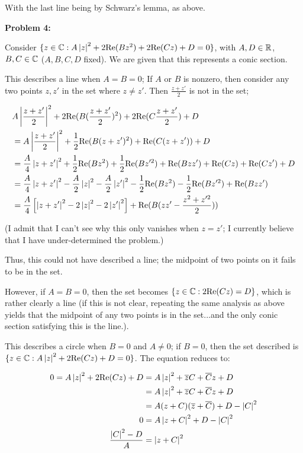 \documentclass[a4paper,12pt]{article}
\begin{document}
With the last line being by Schwarz's lemma, as above.

\shunt

{\bf Problem 4:}

Consider $\{z \in \mathbb{C}: A \left\lvert z \right\rvert^2 + 2\text{Re}(Bz^2) + 2\text{Re}(Cz) + D = 0\}$, with $A,D \in \mathbb{R}$, $B,C \in \mathbb{C}$ ($A,B,C,D$ fixed). We are given that this represents a conic section.

This describes a line when $A=B=0$; If $A$ or $B$ is nonzero, then consider any two points $z,z'$ in the set where $z \neq z'$. Then $\frac{z+z'}{2}$ is not in the set;

\begin{align*}
&A \left\lvert \frac{z+z'}{2} \right\rvert^2 + 2\text{Re}(B(\frac{z+z'}{2})^2) + 2\text{Re}(C\frac{z+z'}{2}) + D\\
&= A \left\lvert \frac{z+z'}{2} \right\rvert^2 + \frac{1}{2}\text{Re}(B(z+z')^2) + \text{Re}(C(z+z')) + D\\
&= \frac{A}{4} \left\lvert z+z' \right\rvert^2 + \frac{1}{2}\text{Re}(Bz^2)+ \frac{1}{2}\text{Re}(Bz'^2) + \text{Re}(Bzz') + \text{Re}(Cz) +\text{Re}(Cz')+ D\\
&= \frac{A}{4} \left\lvert z+z' \right\rvert^2 -\frac{A}{2}\left\lvert z \right\rvert^2 -\frac{A}{2}\left\lvert z' \right\rvert^2- \frac{1}{2}\text{Re}(Bz^2)- \frac{1}{2}\text{Re}(Bz'^2) + \text{Re}(Bzz')\\
&= \frac{A}{4} \left[\left\lvert z+z' \right\rvert^2 -2\left\lvert z \right\rvert^2 -2\left\lvert z' \right\rvert^2\right] + \text{Re}(B(zz'-\frac{z^2+z'^2}{2}))\\
\end{align*}

(I admit that I can't see why this only vanishes when $z=z'$; I currently believe that I have under-determined the problem.) %

Thus, this could not have described a line; the midpoint of two points on it fails to be in the set.

However, if $A=B=0$, then the set becomes $\{z \in \mathbb{C}: 2\text{Re}(Cz) = D\}$, which is rather clearly a line (if this is not clear, repeating the same analysis as above yields that the midpoint of any two points is in the set...and the only conic section satisfying this is the line.).

This describes a circle when $B=0$ and $A \neq 0$; if $B=0$, then the set described is $\{z \in \mathbb{C}: A\left\lvert z \right\rvert^2 + 2\text{Re}(Cz) + D = 0\}$. The equation reduces to:

\begin{align*}
0=A\left\lvert z \right\rvert^2 + 2\text{Re}(Cz) + D &= A\left\lvert z \right\rvert^2 + \overline{z}C + \overline{C}z + D\\
&= A\left\lvert z \right\rvert^2 + \overline{z}C + \overline{C}z + D\\
&= A(z+C)(\overline{z}+\overline{C}) + D-\left\lvert C \right\rvert^2\\
0&= A\left\lvert z+C \right\rvert^2 + D-\left\lvert C \right\rvert^2\\
\frac{\left\lvert C \right\rvert^2-D}{A}&= \left\lvert z+C \right\rvert^2\\
\end{align*}
\end{document}
